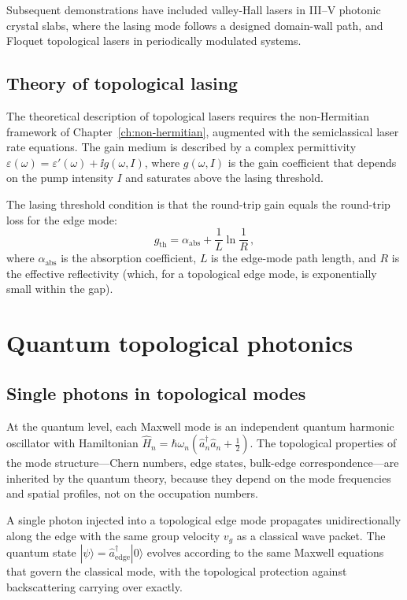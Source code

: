 Subsequent demonstrations have included valley-Hall lasers in III--V
photonic crystal slabs, where the lasing mode follows a designed
domain-wall path, and Floquet topological lasers in periodically
modulated systems.

\subsection{Theory of topological lasing}
\label{sec:ch18-laser-theory}

The theoretical description of topological lasers requires the
non-Hermitian framework of Chapter~\ref{ch:non-hermitian}, augmented
with the semiclassical laser rate equations.  The gain medium is
described by a complex permittivity
$\varepsilon(\omega)=\varepsilon'(\omega)+\ii g(\omega,I)$, where
$g(\omega,I)$ is the gain coefficient that depends on the pump
intensity $I$ and saturates above the lasing threshold.

The lasing threshold condition is that the round-trip gain equals the
round-trip loss for the edge mode:
\begin{equation}\label{eq:ch18-threshold}
  g_{\mathrm{th}} = \alpha_{\mathrm{abs}}
  + \frac{1}{L}\ln\frac{1}{R}\,,
\end{equation}
where $\alpha_{\mathrm{abs}}$ is the absorption coefficient,
$L$ is the edge-mode path length, and $R$ is the effective reflectivity
(which, for a topological edge mode, is exponentially small within the
gap).

\section{Quantum topological photonics}
\label{sec:ch18-quantum}

\subsection{Single photons in topological modes}
\label{sec:ch18-single-photon}

At the quantum level, each Maxwell mode is an independent quantum
harmonic oscillator with Hamiltonian
$\hat{H}_n=\hbar\omega_n(\hat{a}_n^\dagger\hat{a}_n+\frac{1}{2})$.
The topological properties of the mode structure---Chern numbers, edge
states, bulk-edge correspondence---are inherited by the quantum theory,
because they depend on the mode frequencies and spatial profiles, not on
the occupation numbers.

A single photon injected into a topological edge mode propagates
unidirectionally along the edge with the same group velocity $v_g$ as a
classical wave packet.  The quantum state $|\psi\rangle=\hat{a}_{\mathrm{edge}}^\dagger|0\rangle$
evolves according to the same Maxwell equations that govern the
classical mode, with the topological protection against backscattering
carrying over exactly.

